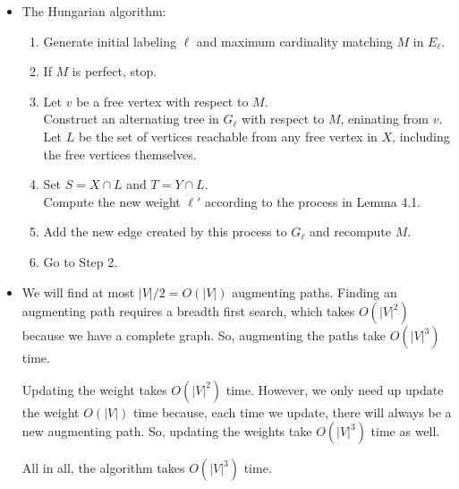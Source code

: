 \documentclass[10pt]{article}
\begin{document}
\begin{itemize}
    \item The Hungarian algorithm:
    \begin{enumerate}
      \item Generate initial labeling $\ell$ and maximum cardinality matching $M$ in $E_\ell$.

      \item If $M$ is perfect, stop.
      
      \item Let $v$ be a free vertex with respect to $M$.\\
      Construct an alternating tree in $G_\ell$ with respect to $M$, eninating from $v$.\\
      Let $L$ be the set of vertices reachable from any free vertex in $X$, including the free vertices themselves.

      \item Set $S = X \cap L$ and $T = Y \cap L$.\\
      Compute the new weight $\ell'$ according to the process in Lemma 4.1.

      \item Add the new edge created by this process to $G_\ell$ and recompute $M$.

      \item Go to Step 2.    
    \end{enumerate}

    \item We will find at most $|V|/2 = O(|V|)$ augmenting paths. Finding an augmenting path requires a breadth first search, which takes $O(|V|^2)$ because we have a complete graph. So, augmenting the paths take $O(|V|^3)$ time.

    Updating the weight takes $O(|V|^2)$ time. However, we only need up update the weight $O(|V|)$ time because, each time we update, there will always be a new augmenting path. So, updating the weights take $O(|V|^3)$ time as well.

    All in all, the algorithm takes $O(|V|^3)$ time.
  \end{itemize}
\end{document}
